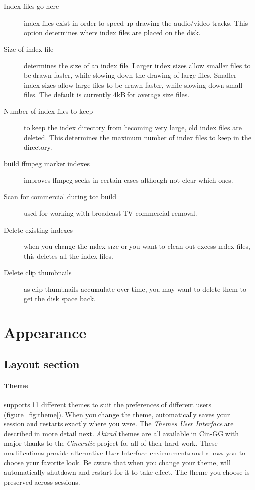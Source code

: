 \begin{description}
    \item[Index files go here] index files exist in order to speed up drawing the audio/video tracks. This option determines where index files are placed on the disk.
    \item[Size of index file] determines the size of an index file. Larger index sizes allow smaller files to be drawn faster, while slowing down the drawing of large files. Smaller index sizes allow large files to be drawn faster, while slowing down small files.  The default is currently 4kB for average size files.
    \item[Number of index files to keep] to keep the index directory from becoming very large, old index files are deleted. This determines the maximum number of index files to keep in the directory.
    \item[build ffmpeg marker indexes] improves ffmpeg seeks in certain cases although not clear which ones.
    \item[Scan for commercial during toc build] used for working with broadcast TV commercial removal.
    \item[Delete existing indexes] when you change the index size or you want to clean out excess index files, this deletes all the index files.
    \item[Delete clip thumbnails] as clip thumbnails accumulate over time, you may want to delete them to get the disk space back.
\end{description}

\section{Appearance}%
\label{sec:appearance}

\subsection{Layout section}%
\label{sub:layout_section}

\paragraph{Theme} \CGG{} supports 11 different themes to suit the preferences of different users (figure~\ref{fig:theme}).  When you change the theme, \CGG{} automatically saves your session and restarts exactly where you were.  The \textit{Themes User Interface} are described in more detail next.  \textit{Akirad} themes are all available in Cin-GG with major thanks to the \textit{Cinecutie} project for all of their hard work. These modifications provide alternative User Interface environments and allows you to choose your favorite look.  Be aware that when you change your theme, \CGG{} will automatically shutdown and restart for it to take effect.  The theme you choose is preserved across sessions.

